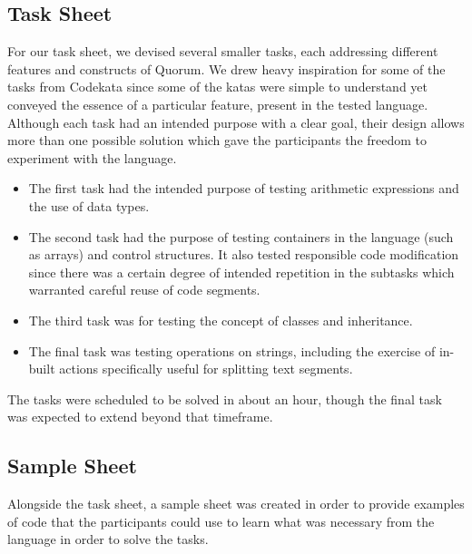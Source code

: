 \documentclass[preprint,10pt]{sigplanconf}
\begin{document}
\subsection{Task Sheet}
For our task sheet, we devised several smaller tasks, each addressing different features and constructs of Quorum. We drew heavy inspiration for some of the tasks from Codekata \cite{Codekata} since some of the katas were simple to understand yet conveyed the essence of a particular feature, present in the tested language.
Although each task had an intended purpose with a clear goal, their design allows more than one possible solution which gave the participants the freedom to experiment with the language.
\begin{itemize}
\item The first task had the intended purpose of testing arithmetic expressions and the use of data types.
\item The second task had the purpose of testing containers in the language (such as arrays) and control structures.
It also tested responsible code modification since there was a certain degree of intended repetition in the subtasks which warranted careful reuse of code segments.%
\item The third task was for testing the concept of classes and inheritance.
\item The final task was testing operations on strings, including the exercise of in-built actions specifically useful for splitting text segments.
\end{itemize}
The tasks were scheduled to be solved in about an hour, though the final task was expected to extend beyond that timeframe.

\subsection{Sample Sheet}
Alongside the task sheet, a sample sheet was created in order to provide examples of code that the participants could use to learn what was necessary from the language in order to solve the tasks. 
\end{document}
